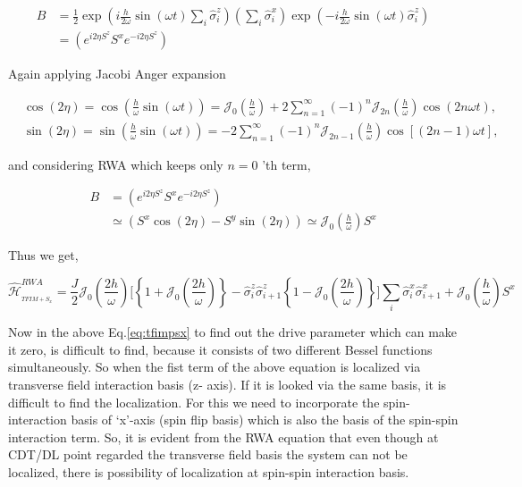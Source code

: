\documentclass[a4paper,11pt]{article}
\begin{document}
\begin{align*}
B & =\frac{1}{2} \exp \left(i \frac{h}{2 \omega} \sin (\omega t) \sum_{i} \hat{\sigma}_{i}^{z}\right)\left(\sum_{i} \hat{\sigma}_{i}^{x}\right) \exp \left(-i \frac{h}{2 \omega} \sin (\omega t) \hat{\sigma}_{i}^{z}\right) \\
& =\left(e^{i 2 \eta S^{z}} S^{x} e^{-i 2 \eta S^{z}}\right)
\end{align*}

Again applying Jacobi Anger expansion

\begin{align*}
& \cos (2 \eta)=\cos \left(\frac{h}{\omega} \sin (\omega t)\right)=\mathcal{J}_{0}\left(\frac{h}{\omega}\right)+2 \sum_{n=1}^{\infty}(-1)^{n} \mathcal{J}_{2 n}\left(\frac{h}{\omega}\right) \cos (2 n \omega t), \\
& \sin (2 \eta)=\sin \left(\frac{h}{\omega} \sin (\omega t)\right)=-2 \sum_{n=1}^{\infty}(-1)^{n} \mathcal{J}_{2 n-1}\left(\frac{h}{\omega}\right) \cos [(2 n-1) \omega t],
\end{align*}

and considering RWA which keeps only $n=0$ 'th term,

\begin{align}
B & =\left(e^{i 2 \eta S^{z}} S^{x} e^{-i 2 \eta S^{z}}\right) \nonumber\\
& \simeq\left(S^{x} \cos (2 \eta)-S^{y} \sin (2 \eta)\right) \simeq \mathcal{J}_{0}\left(\frac{h}{\omega}\right) S^{x}
\label{eq:B}
\end{align}

Thus we get,

\begin{equation}
\hat{\mathcal{H}}_{_{TFIM+S_{x}}}^{R W A}=\frac{J}{2} \mathcal{J}_0\left(\frac{2h}{\omega}\right)\Bigg[\left\{1+ \mathcal{J}_0\left(\frac{2h}{\omega}\right)\right\} - \hat{\sigma}^z_i\hat{\sigma}^z_{i+1}\left\{1- \mathcal{J}_0\left(\frac{2h}{\omega}\right)\right\} \Bigg]\sum_{i} \hat{\sigma}_{i}^{x} \hat{\sigma}_{i+1}^{x} +\mathcal{J}_{0}\left(\frac{h}{\omega}\right) S^{x}
\label{eq:tfimpsx}
\end{equation}

Now in the above Eq.\eqref{eq:tfimpsx} to find out the drive parameter which can make it zero, is difficult to find, because it consists of two different Bessel functions simultaneously. So when the fist term of the above equation is localized via transverse field interaction basis (z- axis). If it is looked via the same basis, it is difficult to find the localization. For this we need to incorporate the spin-interaction basis of `x'-axis (spin flip basis) which is also the basis of the spin-spin interaction term. So, it is evident from the RWA equation that even though at CDT/DL point regarded the transverse field basis the system can not be localized, there is possibility of localization at spin-spin interaction basis.  
\end{document}
